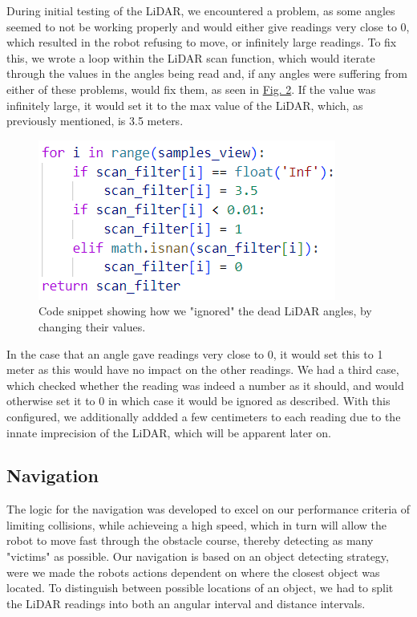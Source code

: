 \documentclass[conference]{IEEEtran}
\begin{document}
During initial testing of the LiDAR, we encountered a problem, as some angles seemed to not be working properly and would either give readings very close to 0, which resulted in the robot refusing to move, or infinitely large readings.
To fix this, we wrote a loop within the LiDAR scan function, which would iterate through the values in the angles being read and, if any angles were suffering from either of these problems, would fix them, as seen in \href{sec:lidar}{Fig. 2}.
If the value was infinitely large, it would set it to the max value of the LiDAR, which, as previously mentioned, is 3.5 meters.

\begin{figure}[b]
    \centerline{\includegraphics[width=0.8\columnwidth\hspace{-0.5cm}]{Pictures/LiDARhvid.png}}
    \caption{Code snippet showing how we "ignored" the dead LiDAR angles, by changing their values.}
    \label{sec:lidar}
    \end{figure}

In the case that an angle gave readings very close to 0, it would set this to 1 meter as this would have no impact on the other readings.
We had a third case, which checked whether the reading was indeed a number as it should, and would otherwise set it to 0 in which case it would be ignored as described.
With this configured, we additionally addded a few centimeters to each reading due to the innate imprecision of the LiDAR, which will be apparent later on.

\subsection{Navigation}
The logic for the navigation was developed to excel on our performance criteria of limiting collisions, while achieveing a high speed, which in turn will allow the robot to move fast through the obstacle course, thereby detecting as many "victims" as possible.
Our navigation is based on an object detecting strategy, were we made the robots actions dependent on where the closest object was located.
To distinguish between possible locations of an object, we had to split the LiDAR readings into both an angular interval and distance intervals.
\end{document}
